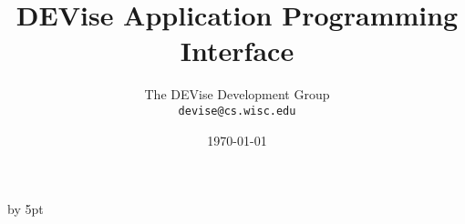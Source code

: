 %



%
%
%
%



\renewcommand{\topfraction}{1.0}
\renewcommand{\bottomfraction}{1.0}
\renewcommand{\textfraction}{0.0}
\advance\intextsep by 5pt

\def\filename#1{{\tt #1}}
\def\code#1{{\tt #1}}
\def\menu#1{{\tt #1}}
\def\term#1{#1}
\def\variable#1{{\tt #1}}

\def\scaleepspic[#1]#2#3{
\begin{figure}[htb]
\centering\leavevmode\epsfxsize=#1\epsfbox{#2}
\caption{#3}
\end{figure}
}

\def\fullepspic#1#2{
\begin{figure}[htb]
\centering\leavevmode\epsfxsize=\textwidth\epsfbox{#1}
\caption{#2}
\end{figure}
}


\title{DEVise Application Programming Interface}
\author{The DEVise Development Group \\
\code{devise@cs.wisc.edu}
}
\date{\today}

\maketitle

